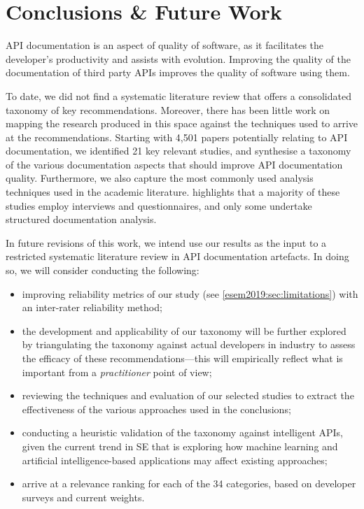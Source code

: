 \section{Conclusions \& Future Work}
\label{esem2019:sec:conclusions}

API documentation is an aspect of quality of software, as it facilitates the developer's productivity and assists with evolution. Improving the quality of the documentation of third party APIs improves the quality of software using them.

To date, we did not find a systematic literature review that offers a consolidated taxonomy of key recommendations. Moreover, there has been little work on mapping the research produced in this space against the techniques used to arrive at the recommendations.
Starting with 4,501 papers potentially relating to API documentation, we identified 21 key relevant studies, and synthesise a taxonomy of the various documentation aspects that should improve API documentation quality. Furthermore, we also capture the most commonly used analysis techniques used in the academic literature.  highlights that a majority of these studies employ interviews and questionnaires, and only some undertake structured documentation analysis. 

In future revisions of this work, we intend use our results as the input to a restricted systematic literature review in API documentation artefacts. In doing so, we will consider conducting the following:

\begin{itemize}
  \item improving reliability metrics of our study (see \cref{esem2019:sec:limitations}) with an inter-rater reliability method;
  \item the development and applicability of our taxonomy will be further explored by triangulating the taxonomy  against actual developers in industry to assess the efficacy of these recommendations---this will empirically reflect what is important from a \textit{practitioner} point of view;
  \item reviewing the techniques and evaluation of our selected studies to extract the effectiveness of the various approaches used in the conclusions;
  \item conducting a heuristic validation of the taxonomy against intelligent APIs, given the current trend in SE that is exploring how machine learning and artificial intelligence-based applications may affect existing approaches;
  \item  arrive at a relevance ranking for each of the 34 categories, based on developer surveys and current weights.
\end{itemize}


